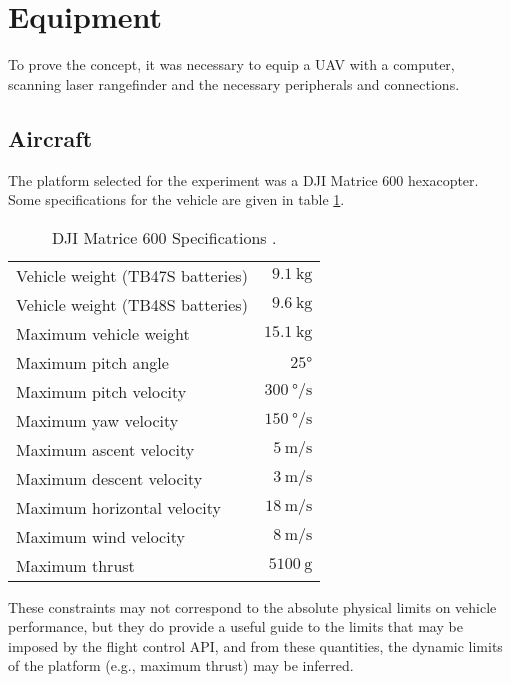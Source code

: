 \label{chapter:Methods}

\section{Equipment}

To prove the concept, it was necessary to equip a UAV with a computer, scanning laser rangefinder and the necessary peripherals and connections.

\subsection{Aircraft}

The platform selected for the experiment was a DJI Matrice 600 hexacopter. Some specifications for the vehicle are given in table \ref{table:djispecs}.

\begin{table}
\begin{center}
\begin{tabular}{ l r }
\hline
Vehicle weight (TB47S batteries) & $\SI{9.1}\kg$ \\ 
Vehicle weight (TB48S batteries) & $\SI{9.6}\kg$ \\
Maximum vehicle weight & $\SI{15.1}\kg$ \\
Maximum pitch angle & $\ang{25}$ \\
Maximum pitch velocity & $\SI{300}{\degree\per\second}$ \\
Maximum yaw velocity & $\SI{150}{\degree\per\second}$ \\
Maximum ascent velocity & $\SI{5}{\metre\per\second}$ \\
Maximum descent velocity & $\SI{3}{\metre\per\second}$ \\
Maximum horizontal velocity & $\SI{18}{\metre\per\second}$ \\
Maximum wind velocity & $\SI{8}{\metre\per\second}$ \\
Maximum thrust & $\SI{5100}{\g}$ \\
\hline
\end{tabular}
\end{center}
\caption{DJI Matrice 600 Specifications \cite{DJI2017}.}
\label{table:djispecs}
\end{table}

These constraints may not correspond to the absolute physical limits on vehicle performance, but they do provide a useful guide to the limits that may be imposed by the flight control API, and from these quantities, the dynamic limits of the platform (e.g., maximum thrust) may be inferred.

